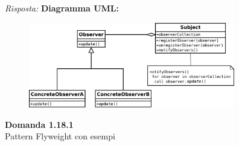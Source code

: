 \documentclass{article}
\newenvironment{problem}[2][Domanda]
    { \begin{mdframed}[backgroundcolor=gray!20] \textbf{#1 #2} \\}
    {  \end{mdframed}}
\newenvironment{solution}
    {\textit{Risposta:}}
    {}
\begin{document}
\begin{solution}
\newline
\textbf{Diagramma UML:}
\begin{figure}[htb!]
	\centering
	\label{ObserverPattern}
	\includegraphics[width=9cm]{./immagini/observerPattern.png}
\end{figure}
\end{solution}

\begin{problem}{1.18.1}
Pattern Flyweight con esempi
\end{problem}
\end{document}
